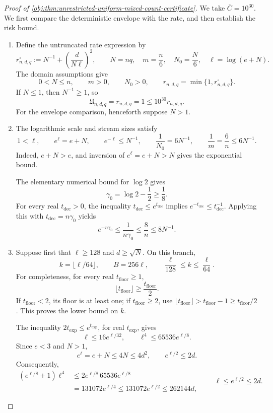 \begin{proof}[Proof of \cref{obj:thm:unrestricted-uniform-mixed-count-certificate}]
We take \(\overline C=10^{30}\). We first compare the deterministic envelope with the rate, and then establish the risk bound.

\begin{enumerate}
\item Define the untruncated rate expression by
\[
r^\circ_{n,d,q}
:=N^{-1}+\left(\frac{d}{N\ell}\right)^2,
\qquad
N=nq,\quad m=\frac n6,\quad N_0=\frac N6,
\quad \ell=\log(e+N).
\]
The domain assumptions give
\[
0<N\le n,\qquad m>0,\qquad N_0>0,
\qquad r_{n,d,q}=\min\{1,r^\circ_{n,d,q}\}.
\]
If \(N\le1\), then \(N^{-1}\ge1\), so
\[
\mathfrak U_{n,d,q}=r_{n,d,q}=1
\le10^{30}r_{n,d,q}.
\]
For the envelope comparison, henceforth suppose \(N>1\).

\item The logarithmic scale and stream sizes satisfy
\[
1<\ell,\qquad e^\ell=e+N,\qquad e^{-\ell}\le N^{-1},
\qquad
\frac1{N_0}=6N^{-1},\qquad
\frac1m=\frac6n\le6N^{-1}.
\]
Indeed, \(e+N>e\), and inversion of \(e^\ell=e+N>N\) gives the exponential bound.

The elementary numerical bound for \(\log2\) gives
\[
\gamma_0=\log2-\frac12\ge\frac18.
\]
For every real \(t_{\mathrm{dec}}>0\), the inequality
\(t_{\mathrm{dec}}\le e^{t_{\mathrm{dec}}}\) implies
\(e^{-t_{\mathrm{dec}}}\le t_{\mathrm{dec}}^{-1}\). Applying this with
\(t_{\mathrm{dec}}=n\gamma_0\) yields
\[
e^{-n\gamma_0}
\le\frac1{n\gamma_0}
\le\frac8n
\le8N^{-1}.
\]

\item Suppose first that \(\ell\ge128\) and \(d\ge\sqrt N\). On this branch,
\[
k=\lfloor\ell/64\rfloor,\qquad B=256\ell,
\qquad
\frac{\ell}{128}\le k\le\frac{\ell}{64}.
\]
For completeness, for every real \(t_{\mathrm{floor}}\ge1\),
\[
\lfloor t_{\mathrm{floor}}\rfloor\ge\frac{t_{\mathrm{floor}}}{2}.
\]
If \(t_{\mathrm{floor}}<2\), its floor is at least one; if
\(t_{\mathrm{floor}}\ge2\), use
\(\lfloor t_{\mathrm{floor}}\rfloor>t_{\mathrm{floor}}-1
\ge t_{\mathrm{floor}}/2\). This proves the lower bound on \(k\).

The inequality \(2t_{\mathrm{exp}}\le e^{t_{\mathrm{exp}}}\), for real
\(t_{\mathrm{exp}}\), gives
\[
\ell\le16e^{\ell/32},
\qquad
\ell^4\le65536e^{\ell/8}.
\]
Since \(e<3\) and \(N>1\),
\[
e^\ell=e+N\le4N\le4d^2,
\qquad e^{\ell/2}\le2d.
\]
Consequently,
\[
\begin{aligned}
(e^{\ell/8}+1)\ell^4
&\le2e^{\ell/8}\,65536e^{\ell/8}\\
&=131072e^{\ell/4}
\le131072e^{\ell/2}
\le262144d,
\end{aligned}
\qquad
\ell\le e^{\ell/2}\le2d.
\]


\end{enumerate}
\end{proof}
